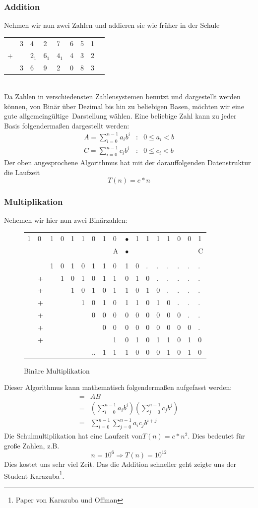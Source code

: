 \subsubsection{Addition}
Nehmen wir nun zwei Zahlen und addieren sie wie früher in der Schule\\
\begin{tabular}{lllllllll}
&3&4&2&7&6&5&1\\
+& &$2_1$&$6_1$&$4_1$&4&3&2\\\hline
&3&6&9&2&0&8&3
\end{tabular}\\
Da Zahlen in verschiedensten Zahlensystemen benutzt und dargestellt werden können, von Binär über Dezimal bis hin zu beliebigen Basen, möch\-ten wir eine gute allgemeingültige\, Darstellung wählen.
Eine beliebige Zahl kann zu jeder Basis folgendermaßen dargestellt werden:
\begin{align*}
A=\sum_{i=0}^{n-1} a_i b^i &:& 0\le a_i<b\\
C=\sum_{i=0}^{n-1} c_i b^i &:& 0\le c_i<b
\end{align*}
Der oben angesprochene Algorithmus hat mit der darauffolgenden Datenstruktur die Laufzeit $$T(n)=c*n$$
\subsubsection{Multiplikation}
Nehemen wir hier nun zwei Binärzahlen: \\[.5em]
\begin{figure}[H]\center\begin{tabular}{l@{ }l@{ }l@{ }l@{ }l@{ }l@{ }l@{ }l@{ }l@{ }l@{ }l@{ }l@{ }l@{ }l@{ }l@{ }l@{ }l}
1&0&1&0&1&1&0&1&0&$\bullet$&1&1&1&1&0&0&1\\
&&&&&&&&A&$\bullet$&&&&&&&C\\
\\
&&1&0&1&0&1&1&0&1&0&.&.&.&.&.&.\\
&+&&1&0&1&0&1&1&0&1&0&.&.&.&.&.\\
&+&&&1&0&1&0&1&1&0&1&0&.&.&.&.\\
&+&&&&1&0&1&0&1&1&0&1&0&.&.&.\\
&+&&&&&0&0&0&0&0&0&0&0&0&.&.\\
&+&&&&&&0&0&0&0&0&0&0&0&0&.\\
&+&&&&&&&1&0&1&0&1&1&0&1&0\\\hline
&&&&&&..&1&1&1&0&0&0&1&0&1&0
\end{tabular}
\caption{Binäre Multiplikation}
\end{figure}
Dieser Algorithmus kann mathematisch folgendermaßen aufgefasst werden:
\begin{align*}
=&AB\\=&\left(\sum_{i=0}^{n-1} a_i b^i\right)\left(\sum_{j=0}^{n-1} c_j b^j\right)\\=&\sum_{i=0}^{n-1}\sum_{j=0}^{n-1}  a_i c_j b^{i+j}
\end{align*}
Die Schulmultiplikation hat eine Laufzeit von\linebreak $T(n)=c*n^2$. Dies bedeutet für große Zahlen, z.B. $$n=10^6 \Rightarrow T(n)=10^{12}$$
Dies kostet uns sehr viel Zeit. Das die Addition schneller geht zeigte uns der Student Karazuba\footnote{Paper von Karazuba und Offman}.

